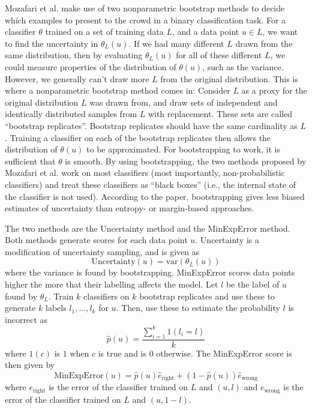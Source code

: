 \documentclass[a4paper]{article}
\begin{document}
    Mozafari et al.\cite{mozafari12} make use of two nonparametric bootstrap methods to decide which examples to present to the crowd in a binary classification task. For a classifier $\theta$ trained on a set of training data $L$, and a data point $u \in L$, we want to find the uncertainty in $\theta_L(u)$. If we had many different $L$ drawn from the same distribution, then by evaluating $\theta_L(u)$ for all of these different $L$, we could measure properties of the distribution of $\theta(u)$, such as the variance. However, we generally can't draw more $L$ from the original distribution. This is where a nonparametric bootstrap method comes in: Consider $L$ as a proxy for the original distribution $L$ was drawn from, and draw sets of independent and identically distributed samples from $L$ with replacement. These sets are called ``bootstrap replicates''. Bootstrap replicates should have the same cardinality as $L$. Training a classifier on each of the bootstrap replicates then allows the distribution of $\theta(u)$ to be approximated. For bootstrapping to work, it is sufficient that $\theta$ is smooth. By using bootstrapping, the two methods proposed by Mozafari et al. work on most classifiers (most importantly, non-probabilistic classifiers) and treat these classifiers as ``black boxes'' (i.e., the internal state of the classifier is not used). According to the paper, bootstrapping gives less biased estimates of uncertainty than entropy- or margin-based approaches.

    The two methods are the Uncertainty method and the MinExpError method. Both methods generate scores for each data point $u$. Uncertainty is a modification of uncertainty sampling\cite{cohn94}, and is given as
    \[
        \mbox{Uncertainty}(u) = \mbox{var}(\theta_L(u))
    \]
    where the variance is found by bootstrapping. MinExpError scores data points higher the more that their labelling affects the model. Let $l$ be the label of $u$ found by $\theta_L$. Train $k$ classifiers on $k$ bootstrap replicates and use these to generate $k$ labels $l_1, \dots, l_k$ for $u$. Then, use these to estimate the probability $l$ is incorrect as
    \[
        \hat p(u) = \frac{\sum_{i = 1}^k 1(l_i = l)}{k}
    \]
    where $1(c)$ is $1$ when $c$ is true and is $0$ otherwise. The MinExpError score is then given by
    \[
        \mbox{MinExpError}(u) = \hat p(u) \hat e_{\text{right}} + (1 - \hat p(u)) \hat e_{\text{wrong}}
    \]
    where $e_\text{right}$ is the error of the classifier trained on $L$ and $(u, l)$ and $e_\text{wrong}$ is the error of the classifier trained on $L$ and $(u, 1 - l)$.
\end{document}

